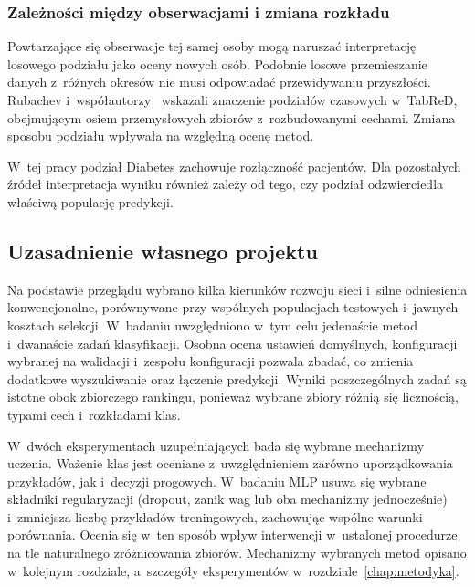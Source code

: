 \subsubsection{Zależności między obserwacjami i zmiana rozkładu}

Powtarzające się obserwacje tej samej osoby mogą naruszać interpretację losowego podziału jako oceny nowych osób. Podobnie losowe przemieszanie danych z~różnych okresów nie musi odpowiadać przewidywaniu przyszłości. Rubachev i~współautorzy~\cite{rubachev2025tabred} wskazali znaczenie podziałów czasowych w~TabReD, obejmującym osiem przemysłowych zbiorów z~rozbudowanymi cechami. Zmiana sposobu podziału wpływała na względną ocenę metod.

W~tej pracy podział Diabetes zachowuje rozłączność pacjentów. Dla pozostałych źródeł interpretacja wyniku również zależy od tego, czy podział odzwierciedla właściwą populację predykcji.

\subsection{Uzasadnienie własnego projektu}
\label{sec:uzasadnienie-projektu}

Na podstawie przeglądu wybrano kilka kierunków rozwoju sieci i~silne odniesienia konwencjonalne, porównywane przy wspólnych populacjach testowych i~jawnych kosztach selekcji. W~badaniu uwzględniono w~tym celu jedenaście metod i~dwanaście zadań klasyfikacji. Osobna ocena ustawień domyślnych, konfiguracji wybranej na walidacji i~zespołu konfiguracji pozwala zbadać, co zmienia dodatkowe wyszukiwanie oraz łączenie predykcji. Wyniki poszczególnych zadań są istotne obok zbiorczego rankingu, ponieważ wybrane zbiory różnią się licznością, typami cech i~rozkładami klas.

W~dwóch eksperymentach uzupełniających bada się wybrane mechanizmy uczenia. Ważenie klas jest oceniane z~uwzględnieniem zarówno uporządkowania przykładów, jak i~decyzji progowych. W~badaniu MLP usuwa się wybrane składniki regularyzacji (dropout, zanik wag lub oba mechanizmy jednocześnie) i~zmniejsza liczbę przykładów treningowych, zachowując wspólne warunki porównania. Ocenia się w~ten sposób wpływ interwencji w~ustalonej procedurze, na tle naturalnego zróżnicowania zbiorów. Mechanizmy wybranych metod opisano w~kolejnym rozdziale, a~szczegóły eksperymentów w~rozdziale~\ref{chap:metodyka}.
